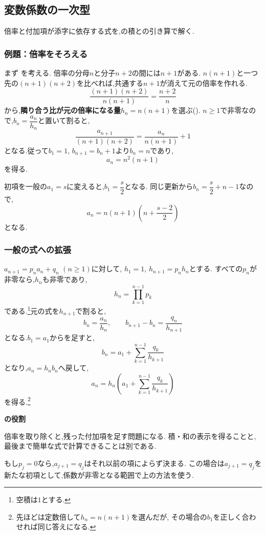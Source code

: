 \subsection{変数係数の一次型}\label{節：変数係数の一次漸化式}
  倍率と付加項が添字に依存する式を,の積との引き算で解く.

  \subsubsection{例題：倍率をそろえる}
  まず
  \BookMathLayout{\[
    a_1=2,\qquad
    a_{n+1}=\frac{n+2}{n}a_n+(n+1)(n+2)
    \quad(n\ge1)
  \]}{\[
    \begin{aligned}
      a_1&=2,\\
      a_{n+1}&=\frac{n+2}{n}a_n+(n+1)(n+2)\\
      &\quad(n\ge1)
    \end{aligned}
  \]}
  を考える.
  倍率の分母$n$と分子$n+2$の間には$n+1$がある.
  $n(n+1)$と一つ先の$(n+1)(n+2)$を比べれば,共通する$n+1$が消えて元の倍率を作れる.
  \[
    \frac{(n+1)(n+2)}{n(n+1)}=\frac{n+2}{n}
  \]
  から,\textbf{隣り合う比が元の倍率になる量}$h_n=n(n+1)$を選ぶ().
  $n\ge1$で非零なので,$b_n=\dfrac{a_n}{h_n}$と置いて割ると,
  \[
    \frac{a_{n+1}}{(n+1)(n+2)}
      =\frac{a_n}{n(n+1)}+1
  \]
  となる.従って$b_1=1$, $b_{n+1}=b_n+1$より$b_n=n$であり,
  \[
    a_n=n^2(n+1)
  \]
  を得る.

  初項を一般の$a_1=s$に変えると,$b_1=\dfrac{s}{2}$となる.
  同じ更新から$b_n=\dfrac{s}{2}+n-1$なので,
  \[
    a_n=n(n+1)\left(n+\frac{s-2}{2}\right)
  \]
  となる.

  \subsubsection{一般の式への拡張}
  $a_{n+1}=p_na_n+q_n$ $(n\ge1)$に対して,
  $h_1=1$, $h_{n+1}=p_nh_n$とする.
  すべての$p_n$が非零なら,$h_n$も非零であり,
  \[
    h_n=\prod_{k=1}^{n-1}p_k
  \]
  である.\footnote{空積は$1$とする.}元の式を$h_{n+1}$で割ると,
  \[
    b_n=\frac{a_n}{h_n},\qquad
    b_{n+1}-b_n=\frac{q_n}{h_{n+1}}
  \]
  となる.$b_1=a_1$からを足すと,
  \[
    b_n=a_1+\sum_{k=1}^{n-1}\frac{q_k}{h_{k+1}}
  \]
  となり,$a_n=h_nb_n$へ戻して,
  \[
    a_n=h_n\left(a_1+\sum_{k=1}^{n-1}\frac{q_k}{h_{k+1}}\right)
  \]
  を得る.\footnote{先ほどは定数倍して$h_n=n(n+1)$を選んだが,
  その場合の$b_1$を正しく合わせれば同じ答えになる.}
  \begin{bookpoint}
    \textbf{の役割}\par
    倍率を取り除くと,残った付加項を足す問題になる.
    積・和の表示を得ることと,最後まで簡単な式で計算できることは別である.
  \end{bookpoint}
  もし$p_j=0$なら,$a_{j+1}=q_j$はそれ以前の項によらず決まる.
  この場合は$a_{j+1}=q_j$を新たな初項として,係数が非零となる範囲で上の方法を使う.

